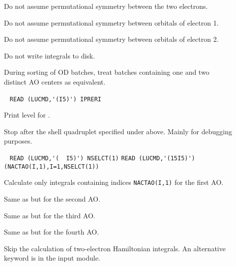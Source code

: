 \begin{description}
\item[] Do not assume permutational symmetry between the
two electrons.

\item[] Do not assume permutational symmetry between
orbitals of electron 1.

\item[] Do not assume permutational symmetry between
orbitals of electron 2.

\item[] Do not write integrals to disk.

\item[] During sorting of OD batches, treat batches
containing one and two distinct AO centers as equivalent.

\item[]\verb| |\newline
\verb|READ (LUCMD,'(I5)') IPRERI|

Print level for {\eri}.

\item[] Stop after the shell quadruplet specified
under  above. Mainly for debugging purposes.

\item[]\verb| |\newline
\verb|READ (LUCMD,'(  I5)') NSELCT(1)|\newline
\verb|READ (LUCMD,'(15I5)') (NACTAO(I,1),I=1,NSELCT(1))|

Calculate only integrals containing indices \verb|NACTAO(I,1)| for the
first AO.

\item[] Same as  but for the second AO.

\item[] Same as  but for the third AO.

\item[] Same as  but for the fourth AO.

\item[] Skip the calculation of two-electron Hamiltonian
integrals. An alternative keyword is  in the 
input module.
\end{description}

